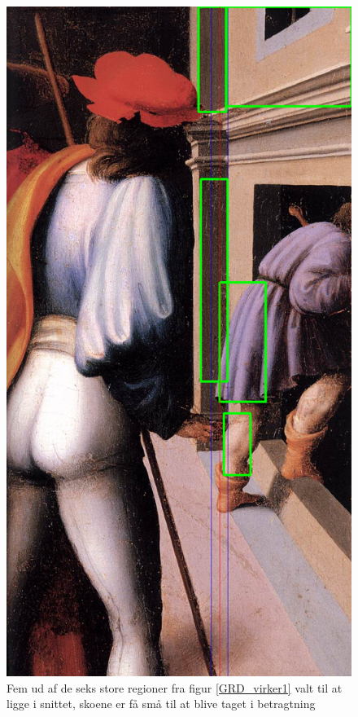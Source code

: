 \begin{figure}[h!!]
	\begin{center}
		\includegraphics[scale=0.3,angle=0]{afsnit/afprovning/billeder/naive_losning/naiv_kfarver_sdetaljer.png}
	\end{center}
	\caption[]{Fem ud af de seks store regioner fra figur
	\ref{GRD_virker1} valt til at ligge i snittet, skoene er få små til
	at blive taget i betragtning}
	\label{naiv_kfarver_sdetaljer}
\end{figure}

